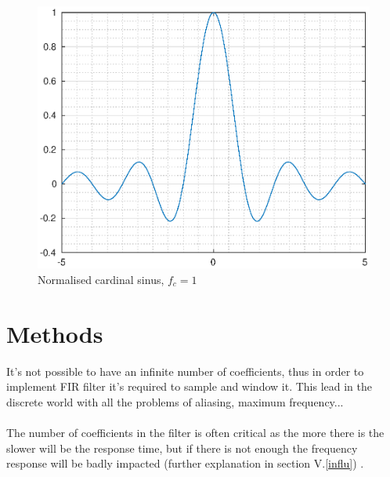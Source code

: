 \documentclass[twoside,twocolumn]{article}
\begin{document}
\begin{figure}[h!]
	\centering
	\includegraphics[scale=0.45]{./images/normalised_sinus.eps}
	\caption{Normalised cardinal sinus, $f_c=1$}
	\label{sinc}
\end{figure}

\section{Methods}

It's not possible to have an infinite number of coefficients, thus in order to implement FIR filter it's required to sample and window it.  This lead in the discrete world with all the problems of aliasing, maximum frequency...\\ \\ The number of coefficients in the filter is often critical as the more there is the slower will be the response time, but if there is not enough the frequency response will be badly impacted (further explanation in section V.\ref{influ}) . \\
\end{document}
